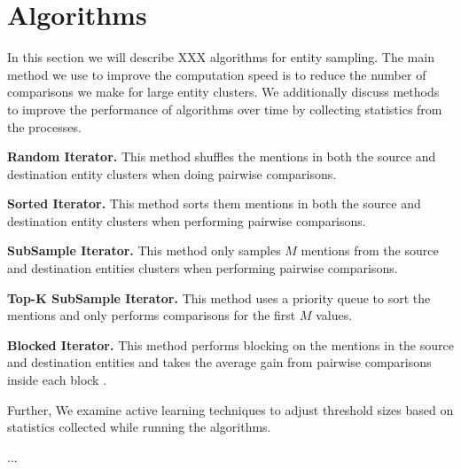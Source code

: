 
\section{Algorithms}

In this section we will describe XXX algorithms for entity sampling.
The main method we use to improve the computation speed is to reduce the
number of comparisons we make for large entity clusters.
We additionally discuss methods to improve the performance of algorithms
over time by collecting statistics from the processes.

\textbf{Random Iterator.} This method shuffles the mentions in both the
source and destination entity clusters when doing pairwise comparisons. 

\textbf{Sorted Iterator.} This method sorts them mentions in both the source
and destination entity clusters when performing pairwise comparisons.

\textbf{SubSample Iterator.} This method only samples $M$ mentions from the
source and destination entities clusters when performing pairwise comparisons.

\textbf{Top-K SubSample Iterator.} This method uses a priority queue to sort
the mentions and only performs comparisons for the first $M$ values.

\textbf{Blocked Iterator.} This method performs blocking on the mentions in the
source and destination entities and takes the average gain from pairwise
comparisons inside each block .


Further, We examine active learning techniques to adjust threshold sizes based on statistics collected while running the algorithms.

...%
